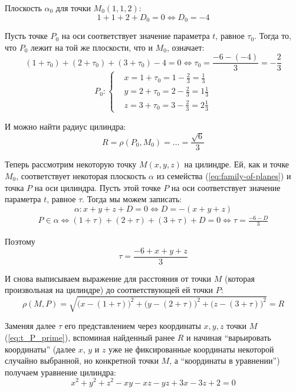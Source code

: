 \documentclass[a4paper,12pt]{article}
\begin{document}
\begin{solution}
    Плоскость $\alpha_0$ для точки $M_0(1, 1, 2)$:
    \[
      1 + 1 + 2 + D_0 = 0 \Leftrightarrow D_0 = -4
    \]
    
    Пусть точке $P_0$ на оси соответствует значение параметра $t$, равное $\tau_0$.
    Тогда то, что $P_0$ лежит на той же плоскости, что и $M_0$, означает:
    \[
      (1 + \tau_0) + (2 + \tau_0) + (3 + \tau_0) - 4 = 0 \Leftrightarrow \tau_0 = \frac{-6 - (-4)}{3} = -\frac{2}{3}
    \]
    \[
      P_0\colon \left\{
        \begin{aligned}
          &x = 1 + \tau_0 = 1 - \frac{2}{3} = \frac{1}{3}\\
          &y = 2 + \tau_0 = 2 - \frac{2}{3} = 1\frac{1}{3}\\
          &z = 3 + \tau_0 = 3 - \frac{2}{3} = 2\frac{1}{3}
        \end{aligned}
      \right.
    \]
    
    И можно найти радиус цилиндра:
    \[
      R = \rho(P_0, M_0) = \ldots = \frac{\sqrt{6}}{3}
    \]
    
    Теперь рассмотрим некоторую точку $M(x, y, z)$ на цилиндре.
    Ей, как и точке $M_0$, соответствует некоторая плоскость $\alpha$ из семейства (\ref{eq:family-of-planes}) и точка $P$ на оси цилиндра.
    Пусть этой точке $P$ на оси соответствует значение параметра $t$, равное $\tau$.
    Тогда мы можем записать:
    \[
      \alpha\colon x + y + z + D = 0 \Leftrightarrow D = -(x + y + z)
    \]
    \begin{equation}
    \begin{split}
      P \in \alpha \Leftrightarrow (1 + \tau) + (2 + \tau) + (3 + \tau) + D = 0
      \Leftrightarrow \tau = \frac{-6 - D}{3}
    \end{split}
    \end{equation}
    
    Поэтому
    \begin{equation}
      \label{eq:t_P_prime}
      \tau = \frac{-6 + x + y + z}{3}
    \end{equation}
    
    И снова выписываем выражение для расстояния от точки $M$ (которая произвольная на цилиндре) до соответствующей ей точки $P$:
    \[
      \rho(M, P) = \sqrt{\bigl(x - (1 + \tau)\bigr)^2 + \bigl(y - (2 + \tau)\bigr)^2 + \bigl(z - (3 + \tau)\bigr)^2} = R
    \]
    
    Заменяя далее $\tau$ его представлением через координаты $x, y, z$ точки $M$ (\ref{eq:t_P_prime}), вспоминая найденный ранее $R$ и начиная ``варьировать координаты'' (далее $x$, $y$ и $z$ уже не фиксированные координаты некоторой случайно выбранной, но конкретной точки $M$, а ``координаты в уравнении'') получаем уравнение цилиндра:
    \[
      x^2 + y^2 + z^2 - xy - xz - yz + 3x - 3z + 2 = 0
    \]
    

\end{solution}
\end{document}
